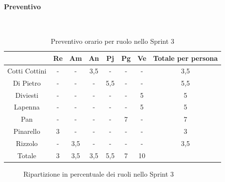 \documentclass{article}
\begin{document}
                \paragraph{Preventivo}\mbox{}\\
                \begin{table}[H]
                    \centering
                    \begin{tabular}{|c|c|c|c|c|c|c|c|}
                    \hline
                                    & Re  & Am  & An  & Pj  & Pg  & Ve  & Totale per persona \\ \hline
                    Cotti Cottini & -   & -   & 3,5 & -   & -   & -   & 3,5                \\ \hline
                    Di Pietro     & -   & -   & -   & 5,5 & -   & -   & 5,5                \\ \hline
                    Diviesti      & -   & -   & -   & -   & -   & 5   & 5                  \\ \hline
                    Lapenna       & -   & -   & -   & -   & -   & 5   & 5                  \\ \hline
                    Pan           & -   & -   & -   & -   & 7  & -   & 7                 \\ \hline
                    Pinarello     & 3   & -   & -   & -   & -   & -   & 3                  \\ \hline
                    Rizzolo       & -   & 3,5 & -   & -   & -   & -   & 3,5                \\ \hline
                    Totale        & 3   & 3,5 & 3,5 & 5,5 & 7  & 10  &                    \\ \hline
                    \end{tabular}
                    \caption{Preventivo orario per ruolo nello Sprint 3}
                \end{table}


                \begin{figure}[H]
                    \centering
                    \caption{Ripartizione in percentuale dei ruoli nello Sprint 3}
                \end{figure}
\end{document}
